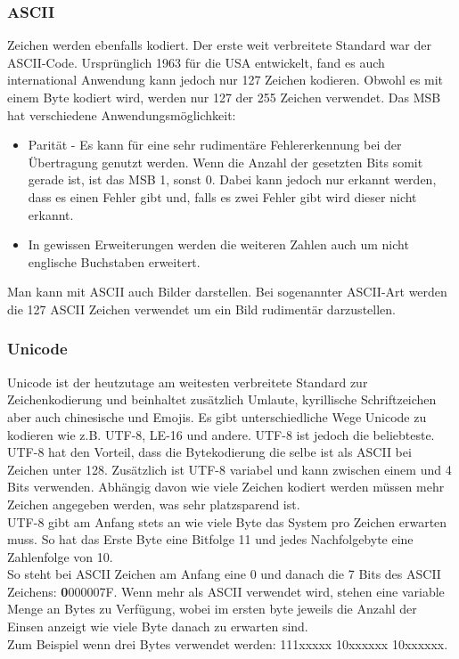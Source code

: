 \documentclass{article}
\begin{document}
		\subsubsection{ASCII}
		Zeichen werden ebenfalls kodiert. Der erste weit verbreitete Standard war der ASCII-Code. Ursprünglich 1963 für die USA entwickelt, fand es auch international Anwendung kann jedoch nur 127 Zeichen kodieren. Obwohl es mit einem Byte kodiert wird, werden nur 127 der 255 Zeichen verwendet. Das MSB hat verschiedene Anwendungsmöglichkeit: \\
		\begin{itemize}
			\item{Parität - Es kann für eine sehr rudimentäre Fehlererkennung bei der Übertragung genutzt werden. Wenn die Anzahl der gesetzten Bits somit gerade ist, ist das MSB 1, sonst 0. Dabei kann jedoch nur erkannt werden, dass es einen Fehler gibt und, falls es zwei Fehler gibt wird dieser nicht erkannt.}
			\item{In gewissen Erweiterungen werden die weiteren Zahlen auch um nicht englische Buchstaben erweitert.}
		\end{itemize}
		Man kann mit ASCII auch Bilder darstellen. Bei sogenannter ASCII-Art werden die 127 ASCII Zeichen verwendet um ein Bild rudimentär darzustellen.
		\subsubsection{Unicode}
		Unicode ist der heutzutage am weitesten verbreitete Standard zur Zeichenkodierung und beinhaltet zusätzlich Umlaute, kyrillische Schriftzeichen aber auch chinesische und Emojis. Es gibt unterschiedliche Wege Unicode zu kodieren wie z.B. UTF-8, LE-16 und andere. UTF-8 ist jedoch die beliebteste. UTF-8 hat den Vorteil, dass die Bytekodierung die selbe ist als ASCII bei Zeichen unter 128. Zusätzlich ist UTF-8 variabel und kann zwischen einem und 4 Bits verwenden. Abhängig davon wie viele Zeichen kodiert werden müssen mehr Zeichen angegeben werden, was sehr platzsparend ist. \\
		UTF-8 gibt am Anfang stets an wie viele Byte das System pro Zeichen erwarten muss. So hat das Erste Byte eine Bitfolge 11 und jedes Nachfolgebyte eine Zahlenfolge von 10. \\
		So steht bei ASCII Zeichen am Anfang eine 0 und danach die 7 Bits des ASCII Zeichens: \textbf{0}000007F. Wenn mehr als ASCII verwendet wird, stehen eine variable Menge an Bytes zu Verfügung, wobei im ersten byte jeweils die Anzahl der Einsen anzeigt wie viele Byte danach zu erwarten sind. \\
		Zum Beispiel wenn drei Bytes verwendet werden: 111xxxxx 10xxxxxx 10xxxxxx.
\end{document}
